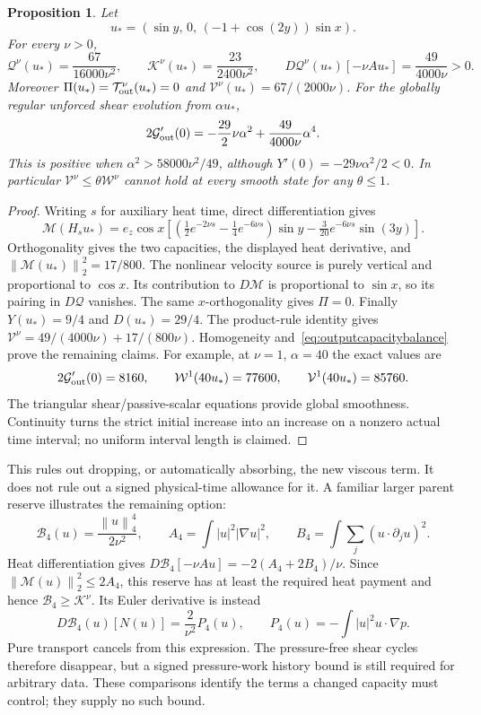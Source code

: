 \documentclass[11pt]{article}
\newtheorem{proposition}{Proposition}
\newcommand{\norm}[1]{\left\lVert#1\right\rVert}
\begin{document}
\begin{proposition}\label{prop:outputheatgrowth}
Let
\[
 u_*=(\sin y,\,0,\,(-1+\cos(2y))\sin x).
\]
For every $\nu>0$,
\[
 \mathcal Q^\nu(u_*)=\frac{67}{16000\nu^2},\qquad
 \mathcal K^\nu(u_*)=\frac{23}{2400\nu^2},\qquad
 D\mathcal Q^\nu(u_*)[-\nu Au_*]=\frac{49}{4000\nu}>0.
\]
Moreover $\Pi(u_*)=\mathcal T_{\rm out}^\nu(u_*)=0$ and
$\mathcal V^\nu(u_*)=67/(2000\nu)$. For the globally regular
unforced shear evolution from $\alpha u_*$,
\[
 2\mathcal G_{\rm out}'(0)
      =-\frac{29}{2}\nu\alpha^2
           +\frac{49}{4000\nu}\alpha^4.
\]
This is positive when $\alpha^2>58000\nu^2/49$, although
$Y'(0)=-29\nu\alpha^2/2<0$. In particular
$\mathcal V^\nu\leq\theta\mathcal W^\nu$ cannot hold at every
smooth state for any $\theta\leq1$.
\end{proposition}
\begin{proof}
Writing $s$ for auxiliary heat time, direct differentiation gives
\[
 \mathcal M(H_su_*)=e_z\cos x\left[
     \left(\tfrac12e^{-2\nu s}-\tfrac14e^{-6\nu s}\right)\sin y
       -\tfrac3{20}e^{-6\nu s}\sin(3y)\right].
\]
Orthogonality gives the two capacities, the displayed heat derivative,
and $\norm{\mathcal M(u_*)}_2^2=17/800$.
The nonlinear velocity source is purely vertical and proportional to
$\cos x$. Its contribution to $D\mathcal M$ is proportional to
$\sin x$, so its pairing in $D\mathcal Q$ vanishes.
The same $x$-orthogonality gives $\Pi=0$.
Finally $Y(u_*)=9/4$ and $D(u_*)=29/4$. The product-rule identity
gives $\mathcal V^\nu=49/(4000\nu)+17/(800\nu)$.
Homogeneity and~\eqref{eq:outputcapacitybalance} prove the remaining
claims. For example, at $\nu=1$, $\alpha=40$ the exact values are
\[
 2\mathcal G_{\rm out}'(0)=8160,\qquad
 \mathcal W^1(40u_*)=77600,\qquad
 \mathcal V^1(40u_*)=85760.
\]
The triangular shear/passive-scalar equations provide global smoothness.
Continuity turns the strict initial increase into an increase on a
nonzero actual time interval; no uniform interval length is claimed.
\end{proof}

This rules out dropping, or automatically absorbing, the new viscous
term. It does not rule out a signed physical-time allowance for it.
A familiar larger parent reserve illustrates the remaining option:
\[
 \mathcal B_4(u)=\frac{\norm u_4^4}{2\nu^2},\qquad
 A_4=\int|u|^2|\nabla u|^2,\qquad
 B_4=\int\sum_j(u\cdot\partial_j u)^2.
\]
Heat differentiation gives
$D\mathcal B_4[-\nu Au]=-2(A_4+2B_4)/\nu$.
Since $\norm{\mathcal M(u)}_2^2\leq2A_4$, this reserve has at
least the required heat payment and hence $\mathcal B_4\geq\mathcal K^\nu$.
Its Euler derivative is instead
\[
 D\mathcal B_4(u)[N(u)]=\frac{2}{\nu^2}P_4(u),\qquad
 P_4(u)=-\int|u|^2u\cdot\nabla p.
\]
Pure transport cancels from this expression. The pressure-free shear
cycles therefore disappear, but a signed pressure-work history bound
is still required for arbitrary data. These comparisons identify the
terms a changed capacity must control; they supply no such bound.
\end{document}
